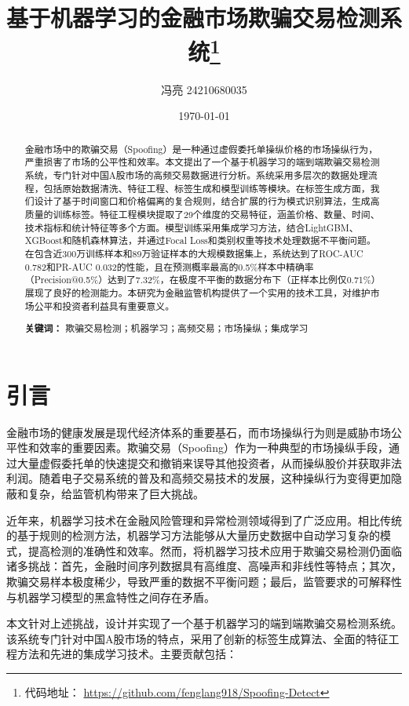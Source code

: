 \documentclass[12pt,a4paper]{article}
\title{基于机器学习的金融市场欺骗交易检测系统\thanks{代码地址： \url{https://github.com/fenglang918/Spoofing-Detect}}}
\author{冯亮 24210680035}
\date{\today}
\begin{document}

\newpage

\maketitle

\begin{abstract}
金融市场中的欺骗交易（Spoofing）是一种通过虚假委托单操纵价格的市场操纵行为，严重损害了市场的公平性和效率。本文提出了一个基于机器学习的端到端欺骗交易检测系统，专门针对中国A股市场的高频交易数据进行分析。系统采用多层次的数据处理流程，包括原始数据清洗、特征工程、标签生成和模型训练等模块。在标签生成方面，我们设计了基于时间窗口和价格偏离的复合规则，结合扩展的行为模式识别算法，生成高质量的训练标签。特征工程模块提取了29个维度的交易特征，涵盖价格、数量、时间、技术指标和统计特征等多个方面。模型训练采用集成学习方法，结合LightGBM、XGBoost和随机森林算法，并通过Focal Loss和类别权重等技术处理数据不平衡问题。在包含近300万训练样本和89万验证样本的大规模数据集上，系统达到了ROC-AUC 0.782和PR-AUC 0.032的性能，且在预测概率最高的0.5\%样本中精确率（Precision@0.5\%）达到了7.32\%，在极度不平衡的数据分布下（正样本比例仅0.71\%）展现了良好的检测能力。本研究为金融监管机构提供了一个实用的技术工具，对维护市场公平和投资者利益具有重要意义。

\textbf{关键词：} 欺骗交易检测；机器学习；高频交易；市场操纵；集成学习
\end{abstract}

\section{引言}

金融市场的健康发展是现代经济体系的重要基石，而市场操纵行为则是威胁市场公平性和效率的重要因素。欺骗交易（Spoofing）作为一种典型的市场操纵手段，通过大量虚假委托单的快速提交和撤销来误导其他投资者，从而操纵股价并获取非法利润。随着电子交易系统的普及和高频交易技术的发展，这种操纵行为变得更加隐蔽和复杂，给监管机构带来了巨大挑战。

近年来，机器学习技术在金融风险管理和异常检测领域得到了广泛应用。相比传统的基于规则的检测方法，机器学习方法能够从大量历史数据中自动学习复杂的模式，提高检测的准确性和效率。然而，将机器学习技术应用于欺骗交易检测仍面临诸多挑战：首先，金融时间序列数据具有高维度、高噪声和非线性等特点；其次，欺骗交易样本极度稀少，导致严重的数据不平衡问题；最后，监管要求的可解释性与机器学习模型的黑盒特性之间存在矛盾。

本文针对上述挑战，设计并实现了一个基于机器学习的端到端欺骗交易检测系统。该系统专门针对中国A股市场的特点，采用了创新的标签生成算法、全面的特征工程方法和先进的集成学习技术。主要贡献包括：
\end{document}
